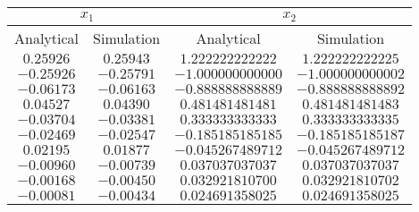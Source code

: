 \begin{tabular}{|c|c|c|c|}
    \hline
    \multicolumn{2}{|c|}{\(x_{1}\)} & \multicolumn{2}{c|}{\(x_{2}\)}\tabularnewline
    \hline
    \hline
    Analytical & Simulation & Analytical & Simulation\tabularnewline
    \hline
    \(0.25926\) & \(0.25943\) & \(1.222222222222\) & \(1.222222222225\)\tabularnewline
    \hline
    \(-0.25926\) & \(-0.25791\) & \(-1.000000000000\) & \(-1.000000000002\)\tabularnewline
    \hline
    \(-0.06173\) & \(-0.06163\) & \(-0.888888888889\) & \(-0.888888888892\)\tabularnewline
    \hline
    \(0.04527\) & \(0.04390\) & \(0.481481481481\) & \(0.481481481483\)\tabularnewline
    \hline
    \(-0.03704\) & \(-0.03381\) & \(0.333333333333\) & \(0.333333333335\)\tabularnewline
    \hline
    \(-0.02469\) & \(-0.02547\) & \(-0.185185185185\) & \(-0.185185185187\)\tabularnewline
    \hline
    \(0.02195\) & \(0.01877\) & \(-0.045267489712\) & \(-0.045267489712\)\tabularnewline
    \hline
    \(-0.00960\) & \(-0.00739\) & \(0.037037037037\) & \(0.037037037037\)\tabularnewline
    \hline
    \(-0.00168\) & \(-0.00450\) & \(0.032921810700\) & \(0.032921810702\)\tabularnewline
    \hline
    \(-0.00081\) & \(-0.00434\) & \(0.024691358025\) & \(0.024691358025\)\tabularnewline
    \hline
\end{tabular}
